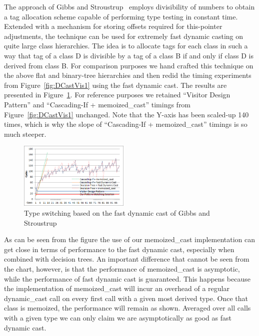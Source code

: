 The approach of Gibbs and Stroustrup~\cite{FastDynCast} employs divisibility of numbers to obtain a 
tag allocation scheme capable of performing type testing in constant time. 
Extended with a mechanism for storing offsets required for this-pointer 
adjustments, the technique can be used for extremely fast dynamic casting on 
quite large class hierarchies. The idea is to allocate tags 
for each class in such a way that tag of a class D is divisible by a tag of a 
class B if and only if class D is derived from class B. For comparison purposes 
we hand crafted this technique on the above flat and binary-tree hierarchies and 
then redid the timing experiments from Figure~\ref{fig:DCastVis1} using the fast 
dynamic cast. The results are presented in Figure~\ref{fig:DCastVis2}. For 
reference purposes we retained ``Visitor Design Pattern'' and ``Cascading-If + 
memoized\_cast'' timings from Figure~\ref{fig:DCastVis1} unchanged. Note that 
the Y-axis has been scaled-up 140 times, which is why the slope of 
``Cascading-If + memoized\_cast'' timings is so much steeper.

\begin{figure}[htbp]
  \centering
    \includegraphics[width=0.47\textwidth]{DCast-vs-Visitors2.png}
  \caption{Type switching based on the fast dynamic cast of Gibbs and Stroustrup~\cite{FastDynCast}}
  \label{fig:DCastVis2}
\end{figure}

As can be seen from the figure the use of our memoized\_cast implementation can 
get close in terms of performance to the fast dynamic cast, especially 
when combined with decision trees. An important difference that cannot be seen 
from the chart, however, is that the performance of memoized\_cast is 
asymptotic, while the performance of fast dynamic cast is guaranteed. This 
happens because the implementation of memoized\_cast will incur an overhead of 
a regular dynamic\_cast call on every first call with a given most derived type. 
Once that class is memoized, the performance will remain as shown. Averaged over 
all calls with a given type we can only claim we are asymptotically as good as 
fast dynamic cast.

